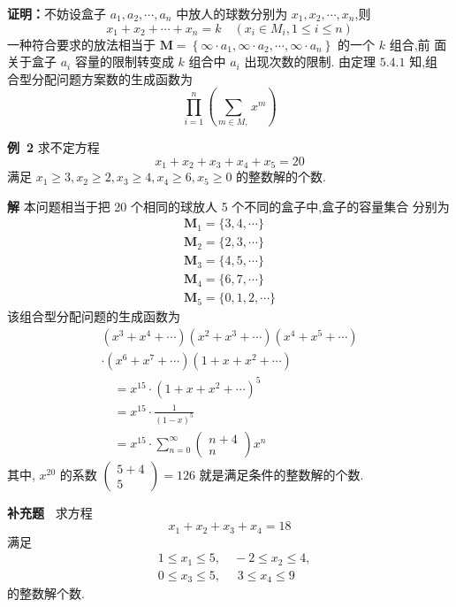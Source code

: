 \documentclass{report}
\begin{document}
\noindent
\textbf{证明：}不妨设盒子 $a_{1}, a_{2}, \cdots, a_{n}$ 中放人的球数分别为 $x_{1}, x_{2}, \cdots, x_{n}$,则
$$
x_{1}+x_{2}+\cdots+x_{n}=k \quad\left(x_{i} \in M_{i}, 1 \leqslant i \leqslant n\right)
$$
一种符合要求的放法相当于 $\boldsymbol{M}=\left\{\infty \cdot a_{1}, \infty \cdot a_{2}, \cdots, \infty \cdot a_{n}\right\}$ 的一个 $k$ 组合,前 面关于盒子 $a_{i}$ 容量的限制转变成 $k$ 组合中 $a_{i}$ 出现次数的限制. 由定理 $5.4 .1$ 知,组 合型分配问题方案数的生成函数为
$$
\prod_{i=1}^{n}\left(\sum_{m \in M,} x^{m}\right)
$$


\textbf{例\ 2} 求不定方程
$$
x_{1}+x_{2}+x_{3}+x_{4}+x_{5}=20
$$
满足
$x_{1} \geqslant 3, x_{2} \geqslant 2, x_{3} \geqslant 4, x_{4} \geqslant 6, x_{5} \geqslant 0$
的整数解的个数.

\textbf{解  }本问题相当于把 20 个相同的球放人 5 个不同的盒子中,盒子的容量集合 分别为
$$
\begin{array}{l}
\boldsymbol{M}_{1}=\{3,4, \cdots\} \\
\boldsymbol{M}_{2}=\{2,3, \cdots\} \\
\boldsymbol{M}_{3}=\{4,5, \cdots\} \\
\boldsymbol{M}_{4}=\{6,7, \cdots\} \\
\boldsymbol{M}_{5}=\{0,1,2, \cdots\}
\end{array}
$$
该组合型分配问题的生成函数为
$$
\begin{array}{l}
\left(x^{3}+x^{4}+\cdots\right)\left(x^{2}+x^{3}+\cdots\right)\left(x^{4}+x^{5}+\cdots\right) \\
\cdot\left(x^{6}+x^{7}+\cdots\right)\left(1+x+x^{2}+\cdots\right) \\
\quad=x^{15} \cdot\left(1+x+x^{2}+\cdots\right)^{5} \\
\quad=x^{15} \cdot \frac{1}{(1-x)^{5}} \\
\quad=x^{15} \cdot \sum_{n=0}^{\infty}\left(\begin{array}{c}
n+4 \\
n
\end{array}\right) x^{n}
\end{array}
$$
其中, $x^{20}$ 的系数 $\left(\begin{array}{c}5+4 \\ 5\end{array}\right)=126$ 就是满足条件的整数解的个数.

\textbf{补充题\ }
求方程 $$x_{1}+x_{2}+x_{3}+x_{4}=18$$ 满足
\begin{align*}
    & 1 \leq x_{1} \leq 5, \quad  -2 \leq x_{2} \leq 4,\\
    & 0 \leq x_{3} \leq 5, \quad \,  \,3 \leq x_{4} \leq 9
\end{align*}
的整数解个数.
\end{document}
